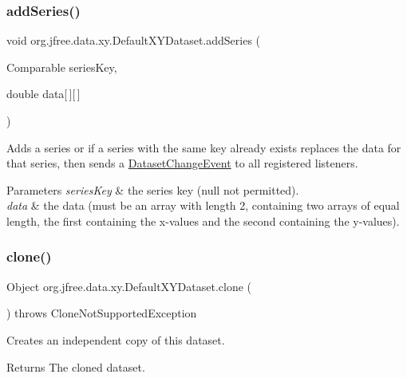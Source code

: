 \subsubsection{\texorpdfstring{add\+Series()}{addSeries()}}
{\footnotesize\ttfamily void org.\+jfree.\+data.\+xy.\+Default\+X\+Y\+Dataset.\+add\+Series (\begin{DoxyParamCaption}\item[{Comparable}]{series\+Key,  }\item[{double}]{data\mbox{[}$\,$\mbox{]}\mbox{[}$\,$\mbox{]} }\end{DoxyParamCaption})}

Adds a series or if a series with the same key already exists replaces the data for that series, then sends a \mbox{\hyperlink{}{Dataset\+Change\+Event}} to all registered listeners.


\begin{DoxyParams}{Parameters}
{\em series\+Key} & the series key ({\ttfamily null} not permitted). \\
\hline
{\em data} & the data (must be an array with length 2, containing two arrays of equal length, the first containing the x-\/values and the second containing the y-\/values). \\
\hline
\end{DoxyParams}
\mbox{\label{classorg_1_1jfree_1_1data_1_1xy_1_1_default_x_y_dataset_a81d3c0d90cd6535b174c5f18d15d830d}} 
\subsubsection{\texorpdfstring{clone()}{clone()}}
{\footnotesize\ttfamily Object org.\+jfree.\+data.\+xy.\+Default\+X\+Y\+Dataset.\+clone (\begin{DoxyParamCaption}{ }\end{DoxyParamCaption}) throws Clone\+Not\+Supported\+Exception}

Creates an independent copy of this dataset.

\begin{DoxyReturn}{Returns}
The cloned dataset.
\end{DoxyReturn}

